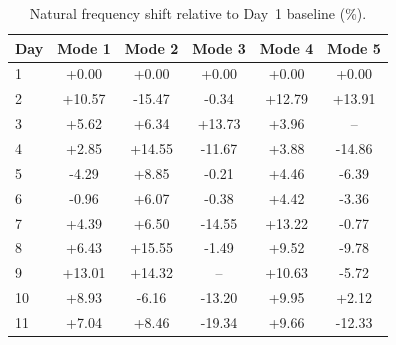 \begin{table}[htbp]
\centering
\caption{Natural frequency shift relative to Day~1 baseline (\%).}
\label{tab:freq_shift}
\begin{tabular}{lccccc}
\toprule
Day & Mode 1 & Mode 2 & Mode 3 & Mode 4 & Mode 5 \\
\midrule
1 & +0.00 & +0.00 & +0.00 & +0.00 & +0.00 \\
2 & +10.57 & -15.47 & -0.34 & +12.79 & +13.91 \\
3 & +5.62 & +6.34 & +13.73 & +3.96 & -- \\
4 & +2.85 & +14.55 & -11.67 & +3.88 & -14.86 \\
5 & -4.29 & +8.85 & -0.21 & +4.46 & -6.39 \\
6 & -0.96 & +6.07 & -0.38 & +4.42 & -3.36 \\
7 & +4.39 & +6.50 & -14.55 & +13.22 & -0.77 \\
8 & +6.43 & +15.55 & -1.49 & +9.52 & -9.78 \\
9 & +13.01 & +14.32 & -- & +10.63 & -5.72 \\
10 & +8.93 & -6.16 & -13.20 & +9.95 & +2.12 \\
11 & +7.04 & +8.46 & -19.34 & +9.66 & -12.33 \\
\bottomrule
\end{tabular}
\end{table}